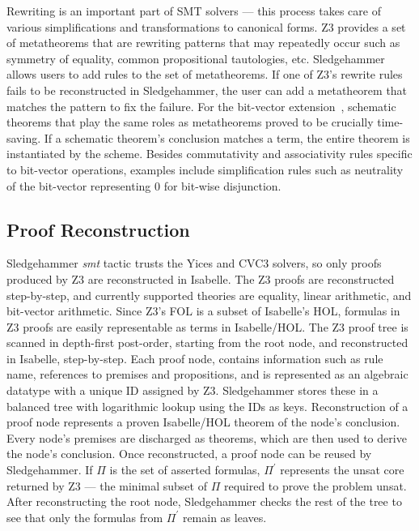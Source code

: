 \documentclass{article}
\begin{document}
		Rewriting is an important part of SMT solvers --- 
		this process takes 
		care of various simplifications and 
		transformations to canonical forms. Z3 
		provides a set of metatheorems that are 
		rewriting patterns that may repeatedly 
		occur such as symmetry of equality, common 
		propositional tautologies, etc. Sledgehammer
		allows users to add rules to the set of 
		metatheorems. If one of Z3's rewrite rules 
		fails to be reconstructed in Sledgehammer, 
		the user can add a metatheorem that 
		matches the pattern to fix the failure.
		For the bit-vector 
		extension~\cite{10.1007/978-3-642-25379-9_15}, 
		schematic theorems that play the same roles 
		as metatheorems proved to be crucially 
		time-saving. If a schematic theorem's conclusion 
		matches a term, the entire theorem is 
		instantiated by the scheme. Besides commutativity 
		and associativity rules specific to bit-vector
		operations, examples include simplification 
		rules such as neutrality of the bit-vector 
		representing $0$ for bit-wise disjunction.
		
	\subsection{Proof Reconstruction}
		Sledgehammer \textit{smt} tactic trusts the Yices 
		and CVC3 solvers, so only proofs produced 
		by Z3 are reconstructed in Isabelle.
		The Z3 proofs are reconstructed step-by-step,
		and currently supported theories are equality, 
		linear arithmetic, and bit-vector arithmetic.
		Since Z3's FOL is a subset of Isabelle's HOL,
		formulas in Z3 proofs are easily representable 
		as terms in Isabelle/HOL. The Z3 proof tree
		is scanned in depth-first post-order, starting 
		from the root node, and reconstructed in Isabelle,
		step-by-step. Each proof node, contains information 
		such as rule name, references to premises and 
		propositions, and is represented as an 
		algebraic datatype with a unique ID assigned
		by Z3. Sledgehammer stores these in a balanced 
		tree with logarithmic lookup using the IDs as
		keys. Reconstruction of a proof node 
		represents a proven Isabelle/HOL theorem of 
		the node's conclusion. Every node's 
		premises are discharged as theorems, which are then 
		used to derive the node's conclusion. Once 
		reconstructed, a proof node can be reused 
		by Sledgehammer. If $\Pi$ is the set of asserted 
		formulas, $\Pi^\prime$ represents the unsat 
		core returned by Z3 --- the minimal subset of 
		$\Pi$ required to prove the problem unsat. 
		After reconstructing the root node, Sledgehammer 
		checks the rest of the tree to see that only the 
		formulas from $\Pi^\prime$ remain as leaves.
		
\end{document}
